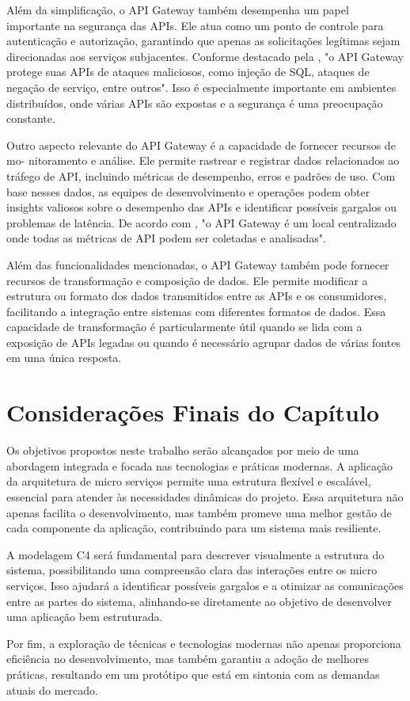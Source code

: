 Além da simplificação, o API Gateway também desempenha um papel importante na
segurança das APIs. Ele atua como um ponto de controle para autenticação e autorização,
garantindo que apenas as solicitações legítimas sejam direcionadas aos serviços subjacentes.
Conforme destacado pela \cite{AWS2023}, "o API Gateway protege suas APIs de ataques maliciosos,
como injeção de SQL, ataques de negação de serviço, entre outros". Isso é especialmente
importante em ambientes distribuídos, onde várias APIs são expostas e a segurança é uma
preocupação constante.

Outro aspecto relevante do API Gateway é a capacidade de fornecer recursos de mo-
nitoramento e análise. Ele permite rastrear e registrar dados relacionados ao tráfego de API,
incluindo métricas de desempenho, erros e padrões de uso. Com base nesses dados, as equipes
de desenvolvimento e operações podem obter insights valiosos sobre o desempenho das APIs
e identificar possíveis gargalos ou problemas de latência. De acordo com \cite{APIS2023}, "o
API Gateway é um local centralizado onde todas as métricas de API podem ser coletadas e
analisadas".

Além das funcionalidades mencionadas, o API Gateway também pode fornecer recursos
de transformação e composição de dados. Ele permite modificar a estrutura ou formato dos
dados transmitidos entre as APIs e os consumidores, facilitando a integração entre sistemas com
diferentes formatos de dados. Essa capacidade de transformação é particularmente útil quando
se lida com a exposição de APIs legadas ou quando é necessário agrupar dados de várias fontes
em uma única resposta.

\section{Considerações Finais do Capítulo}

Os objetivos propostos neste trabalho serão alcançados por meio de uma abordagem integrada e focada nas tecnologias e práticas modernas.
A aplicação da arquitetura de micro serviços permite uma estrutura flexível e escalável, essencial para atender às necessidades dinâmicas do projeto.
Essa arquitetura não apenas facilita o desenvolvimento, mas também promeve uma melhor gestão de cada componente da aplicação, contribuindo para um sistema mais resiliente.

A modelagem C4 será fundamental para descrever visualmente a estrutura do sistema, possibilitando uma compreensão clara das interações entre os micro serviços.
Isso ajudará a identificar possíveis gargalos e a otimizar as comunicações entre as partes do sistema, alinhando-se diretamente ao objetivo de desenvolver uma aplicação bem estruturada.

Por fim, a exploração de técnicas e tecnologias modernas não apenas proporciona eficiência no desenvolvimento, mas também garantiu a adoção de melhores práticas, resultando em um protótipo que está em sintonia com as demandas atuais do mercado.

